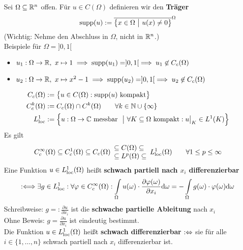 \begin{beispiel}\enter
	Sei $\Omega\subseteq\mathbb{R}^n$ offen. Für $u\in C(\Omega)$ definieren wir den \textbf{Träger}
	\begin{align*}
		\operatorname{supp}(u):=\overline{\big\lbrace x\in\Omega~\big|~u(x)\neq0\big\rbrace}^\Omega
	\end{align*}
	(Wichtig: Nehme den Abschluss in $\Omega$, nicht in $\mathbb{R}^n$.)\\
	Beispiele für $\Omega=]0,1[$
	\begin{itemize}
		\item $u_1:\Omega\to\mathbb{R},~x\mapsto 1\implies\operatorname{supp}(u_1)=]0,1[\implies u_1\not\in C_c(\Omega)$
		\item $u_2:\Omega\to\mathbb{R},~x\mapsto x^2-1\implies\operatorname{supp}(u_2)=]0,1[\implies u_2\not\in C_c(\Omega)$
	\end{itemize}
	\begin{align*}
		C_c(\Omega)&:=\big\lbrace u\in C(\Omega):\operatorname{supp}(u)\text{ kompakt}\big\rbrace\\
		C_c^k(\Omega)&:=C_c(\Omega)\cap C^k(\Omega)\qquad\forall k\in\mathbb{N}\cup\lbrace\infty\rbrace\\
		L^1_{\text{loc}}&:=\Big\lbrace u:\Omega\to\mathbb{C}\text{ messbar }~\big|~\forall K\subseteq\Omega\text{ kompakt}:u\big|_K\in L^1(K)\Big\rbrace
	\end{align*}
	Es gilt
	\begin{align*}
		C_c^\infty(\Omega)\subseteq C^1_c(\Omega)\subseteq C_c(\Omega)\begin{array}{l}
			\subseteq C(\Omega)\subseteq\\
			\subseteq L^p(\Omega)\subseteq
		\end{array} L^1_{\text{loc}}(\Omega)\qquad\forall 1\leq p\leq\infty
	\end{align*}
	Eine Funktion $u\in L^1_{\text{loc}}(\Omega)$ heißt \textbf{schwach partiell nach $x_i$ differenzierbar}
	\begin{align*}
		:\Longleftrightarrow\exists g\in L^1_{\text{loc}}:\forall\varphi\in C^\infty_c(\Omega):\int\limits_\Omega u(\omega)\cdot\frac{\partial\varphi(\omega)}{\partial x_i}\mathrm{d}\omega=-\int\limits_\Omega g(\omega)\cdot\varphi(\omega)\mathrm{d}\omega
	\end{align*}
	Schreibweise: $g=:\frac{\partial u}{\partial x_i}$ ist die \textbf{schwache partielle Ableitung} nach $x_i$\\
	Ohne Beweis: $g=\frac{\partial u}{\partial x_i}$ ist eindeutig bestimmt.\\
	Die Funktion $u\in L^1_{\text{loc}}(\Omega)$ heißt \textbf{schwach differenzierbar} $:\Leftrightarrow$ sie für alle $i\in\lbrace1,\ldots,n\rbrace$ schwach partiell nach $x_i$ differenzierbar ist. 

\end{beispiel}
